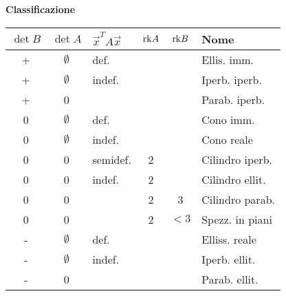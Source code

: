 \textbf{Classificazione}

\begin{tabular}{c|c|l|c|c|l}
	\boldmath$\det B$
	         & \boldmath$\det A$
	                       & \boldmath$\vec{x}^TA\vec{x}$
	                                  & \boldmath$\mathrm{rk} A$
	                                      & \boldmath$\mathrm{rk} B$
	                                             & \textbf{Nome} \\
	\hline
	+        & $\emptyset$ & def.     &   &      & Ellis. imm. \\
	+        & $\emptyset$ & indef.   &   &      & Iperb. iperb. \\
	+        & 0           &          &   &      & Parab. iperb. \\
	\hline
	0        & $\emptyset$ & def.     &   &      & Cono imm. \\
	0        & $\emptyset$ & indef.   &   &      & Cono reale \\
	0        & 0           & semidef. & 2 &      & Cilindro iperb. \\
	0        & 0           & indef.   & 2 &      & Cilindro ellit. \\
	0        & 0           &          & 2 & 3    & Cilindro parab. \\
	0        & 0           &          & 2 & $<3$ & Spezz. in piani \\
	\hline
	-        & $\emptyset$ & def.     &   &      & Elliss. reale \\
	-        & $\emptyset$ & indef.   &   &      & Iperb. ellit. \\
	-        & 0           &          &   &      & Parab. ellit. \\
\end{tabular}

